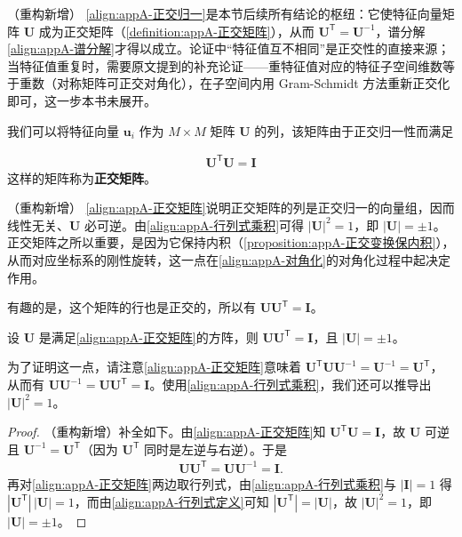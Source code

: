 \documentclass[../main.tex]{subfiles}
\begin{document}
\begin{remark}（重构新增）
\eqref{align:appA-正交归一}是本节后续所有结论的枢纽：它使特征向量矩阵 $\bm{U}$ 成为正交矩阵（\cref{definition:appA-正交矩阵}），从而 $\bm{U}^{\mathsf{T}}=\bm{U}^{-1}$，谱分解\eqref{align:appA-谱分解}才得以成立。论证中“特征值互不相同”是正交性的直接来源；当特征值重复时，需要原文提到的补充论证——重特征值对应的特征子空间维数等于重数（对称矩阵可正交对角化），在子空间内用 Gram-Schmidt 方法重新正交化即可，这一步本书未展开。
\end{remark}

我们可以将特征向量 $\bm{u}_i$ 作为 $M\times M$ 矩阵 $\bm{U}$ 的列，该矩阵由于正交归一性而满足
\begin{definition}[正交矩阵]\label{definition:appA-正交矩阵}
\begin{align}
  \bm{U}^{\mathsf{T}}\bm{U}=\bm{I}
  \label{align:appA-正交矩阵}
\end{align}
这样的矩阵称为\textbf{正交矩阵}。
\end{definition}

\begin{remark}（重构新增）
\eqref{align:appA-正交矩阵}说明正交矩阵的列是正交归一的向量组，因而线性无关、$\bm{U}$ 必可逆。由\eqref{align:appA-行列式乘积}可得 $|\bm{U}|^{2}=1$，即 $|\bm{U}|=\pm1$。正交矩阵之所以重要，是因为它保持内积（\cref{proposition:appA-正交变换保内积}），从而对应坐标系的刚性旋转，这一点在\eqref{align:appA-对角化}的对角化过程中起决定作用。
\end{remark}

有趣的是，这个矩阵的行也是正交的，所以有 $\bm{U}\bm{U}^{\mathsf{T}}=\bm{I}$。

\begin{proposition}[正交矩阵的行正交性与行列式]\label{proposition:appA-正交矩阵的性质}
设 $\bm{U}$ 是满足\eqref{align:appA-正交矩阵}的方阵，则 $\bm{U}\bm{U}^{\mathsf{T}}=\bm{I}$，且 $|\bm{U}|=\pm1$。
\end{proposition}

为了证明这一点，请注意\eqref{align:appA-正交矩阵}意味着 $\bm{U}^{\mathsf{T}}\bm{U}\bm{U}^{-1}=\bm{U}^{-1}=\bm{U}^{\mathsf{T}}$，从而有 $\bm{U}\bm{U}^{-1}=\bm{U}\bm{U}^{\mathsf{T}}=\bm{I}$。使用\eqref{align:appA-行列式乘积}，我们还可以推导出 $|\bm{U}|^{2}=1$。

\begin{proof}
（重构新增）补全如下。由\eqref{align:appA-正交矩阵}知 $\bm{U}^{\mathsf{T}}\bm{U}=\bm{I}$，故 $\bm{U}$ 可逆且 $\bm{U}^{-1}=\bm{U}^{\mathsf{T}}$（因为 $\bm{U}^{\mathsf{T}}$ 同时是左逆与右逆）。于是
\begin{align*}
  \bm{U}\bm{U}^{\mathsf{T}}=\bm{U}\bm{U}^{-1}=\bm{I}.
\end{align*}
再对\eqref{align:appA-正交矩阵}两边取行列式，由\eqref{align:appA-行列式乘积}与 $|\bm{I}|=1$ 得 $|\bm{U}^{\mathsf{T}}|\,|\bm{U}|=1$，而由\eqref{align:appA-行列式定义}可知 $|\bm{U}^{\mathsf{T}}|=|\bm{U}|$，故 $|\bm{U}|^{2}=1$，即 $|\bm{U}|=\pm1$。
\end{proof}
\end{document}
